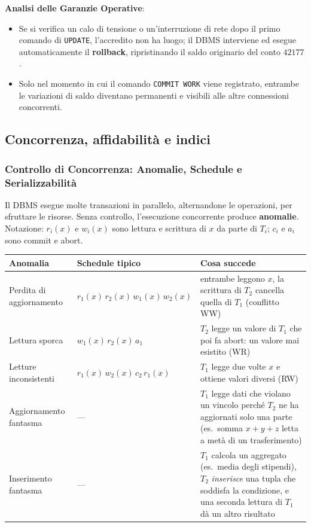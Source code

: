 \documentclass[12pt]{extarticle}
\begin{document}
\noindent \textbf{Analisi delle Garanzie Operative}:
\begin{itemize}
    \item Se si verifica un calo di tensione o un'interruzione di rete dopo il primo comando di \texttt{UPDATE}, l'accredito non ha luogo; il DBMS interviene ed esegue automaticamente il \textbf{rollback}, ripristinando il saldo originario del conto $42177$.
    \item Solo nel momento in cui il comando \texttt{COMMIT WORK} viene registrato, entrambe le variazioni di saldo diventano permanenti e visibili alle altre connessioni concorrenti.
\end{itemize}

\subsection{Concorrenza, affidabilità e indici}

\subsubsection{Controllo di Concorrenza: Anomalie, Schedule e Serializzabilità}

\noindent Il DBMS esegue molte transazioni in parallelo, alternandone le operazioni, per sfruttare le risorse. Senza controllo, l'esecuzione concorrente produce \textbf{anomalie}. Notazione: $r_i(x)$ e $w_i(x)$ sono lettura e scrittura di $x$ da parte di $T_i$; $c_i$ e $a_i$ sono commit e abort.

\begin{center}
\small
\begin{tabular}{p{3.6cm}p{4.2cm}p{7cm}}
    \toprule
    \textbf{Anomalia} & \textbf{Schedule tipico} & \textbf{Cosa succede} \\
    \midrule
    Perdita di aggiornamento & $r_1(x)\,r_2(x)\,w_1(x)\,w_2(x)$ & entrambe leggono $x$, la scrittura di $T_2$ cancella quella di $T_1$ (conflitto WW) \\
    Lettura sporca & $w_1(x)\,r_2(x)\,a_1$ & $T_2$ legge un valore di $T_1$ che poi fa abort: un valore mai esistito (WR) \\
    Letture inconsistenti & $r_1(x)\,w_2(x)\,c_2\,r_1(x)$ & $T_1$ legge due volte $x$ e ottiene valori diversi (RW) \\
    Aggiornamento fantasma & --- & $T_1$ legge dati che violano un vincolo perché $T_2$ ne ha aggiornati solo una parte (es.\ somma $x+y+z$ letta a metà di un trasferimento) \\
    Inserimento fantasma & --- & $T_1$ calcola un aggregato (es.\ media degli stipendi), $T_2$ \emph{inserisce} una tupla che soddisfa la condizione, e una seconda lettura di $T_1$ dà un altro risultato \\
    \bottomrule
\end{tabular}
\end{center}
\end{document}
